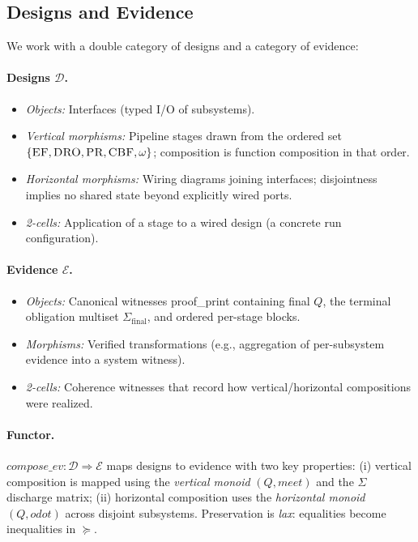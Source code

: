\documentclass[11pt]{article}
\theoremstyle{plain}
\theoremstyle{definition}
\theoremstyle{remark}
\def\Q{Q}%
\def\Sig{\Sigma}%
\def\composeev{compose\_ev}%
\def\vmeet{meet}%
\def\hplus{odot}%
\def\code#1{#1}%
\DeclareRobustCommand{\Q}{\texorpdfstring{\ensuremath{\mathcal{Q}}}{Q}}     %
\DeclareRobustCommand{\Sig}{\texorpdfstring{\ensuremath{\Sigma}}{\Sigma}}   %
\newcommand{\cD}{\mathcal{D}}    %
\newcommand{\cE}{\mathcal{E}}    %
\DeclareMathOperator{\composeevOp}{compose\_ev}
\DeclareRobustCommand{\composeev}{\texorpdfstring{\ensuremath{\composeevOp}}{compose\_ev}}
\newcommand{\vmeet}{\wedge}                    %
\newcommand{\hplus}{\odot}                     %
\newcommand{\geqQ}{\succeq}
\newcommand{\code}[1]{\texttt{\textup{#1}}}    %
\newcommand{\EF}{\textsc{EF}}
\newcommand{\DRO}{\textsc{DRO}}
\newcommand{\PR}{\textsc{PR}}
\newcommand{\CBF}{\textsc{CBF}}
\newcommand{\om}{\ensuremath{\omega}}
\def\Q{Q}%
\def\Sig{\Sigma}%
\def\composeev{compose\_ev}%
\def\vmeet{meet}%
\def\hplus{odot}%
\def\code#1{#1}%
\begin{document}
\subsection{Designs and Evidence}
We work with a double category of designs and a category of evidence:

\paragraph{Designs \(\cD\).}
\begin{itemize}[leftmargin=1.8em]
  \item \emph{Objects:} Interfaces (typed I/O of subsystems).
  \item \emph{Vertical morphisms:} Pipeline stages drawn from the ordered set \(\{\EF,\DRO,\PR,\CBF,\om\}\); composition is function composition in that order.
  \item \emph{Horizontal morphisms:} Wiring diagrams joining interfaces; disjointness implies no shared state beyond explicitly wired ports.
  \item \emph{2-cells:} Application of a stage to a wired design (a concrete run configuration).
\end{itemize}

\paragraph{Evidence \(\cE\).}
\begin{itemize}[leftmargin=1.8em]
  \item \emph{Objects:} Canonical witnesses \code{proof\_print} containing final \(\Q\), the terminal obligation multiset \(\Sigma_{\mathrm{final}}\), and ordered per-stage blocks.
  \item \emph{Morphisms:} Verified transformations (e.g., aggregation of per-subsystem evidence into a system witness).
  \item \emph{2-cells:} Coherence witnesses that record how vertical/horizontal compositions were realized.
\end{itemize}

\paragraph{Functor.}
\(\composeev:\cD\Rightarrow\cE\) maps designs to evidence with two key properties: (i) vertical composition is mapped using the \emph{vertical monoid} \((\Q,\vmeet)\) and the \(\Sig\) discharge matrix; (ii) horizontal composition uses the \emph{horizontal monoid} \((\Q,\hplus)\) across disjoint subsystems. Preservation is \emph{lax}: equalities become inequalities in $\geqQ$.
\end{document}
